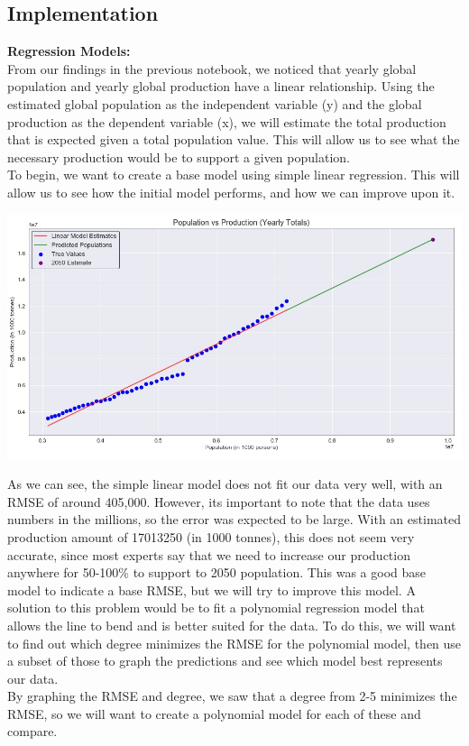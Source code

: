 \documentclass[12pt, a4paper]{article}
\begin{document}
\begin{spacing}{1.1}

	\subsection{Implementation}
	\textbf{Regression Models:}\\
	From our findings in the previous notebook, we noticed that yearly global population and yearly global production have a linear relationship. Using the estimated global population as the independent variable (y) and the global production as the dependent variable (x), we will estimate the total production that is expected given a total population value. This will allow us to see what the necessary production would be to support a given population. \vspace*{2mm}\\
	To begin, we want to create a base model using simple linear regression. This will allow us to see how the initial model performs, and how we can improve upon it.
	\begin{center}
	\includegraphics[scale=.6]{linear_model}
	\end{center}
	As we can see, the simple linear model does not fit our data very well, with an RMSE of around 405,000. However, its important to note that the data uses numbers in the millions, so the error was expected to be large. With an estimated production amount of 17013250 (in 1000 tonnes), this does not seem very accurate, since most experts say that we need to increase our production anywhere for 50-100\% to support to 2050 population. This was a good base model to indicate a base RMSE, but we will try to improve this model. A solution to this problem would be to fit a polynomial regression model that allows the line to bend and is better suited for the data. To do this, we will want to find out which degree minimizes the RMSE for the polynomial model, then use a subset of those to graph the predictions and see which model best represents our data. \vspace*{2mm}\\
	By graphing the RMSE and degree, we saw that a degree from 2-5 minimizes the RMSE, so we will want to create a polynomial model for each of these and compare. \newpage
	

\end{spacing}
\end{document}
